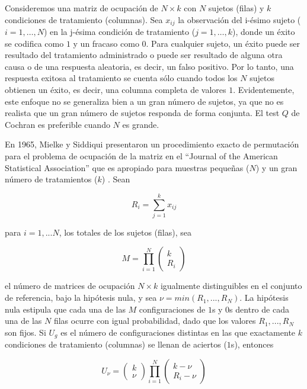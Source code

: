 \documentclass[12pt,a4paper,]{book}
\numberwithin{dummy}{section}
\theoremstyle{ocrenumbox}
\theoremstyle{blacknumex}
\theoremstyle{blacknumbox}
\theoremstyle{ocrenum}
\theoremstyle{ocrenum}
\begin{document}
Consideremos una matriz de ocupación de \(N\times k\) con \(N\) sujetos
(filas) y \(k\) condiciones de tratamiento (columnas). Sea \(x_{ij}\) la
observación del i-ésimo sujeto (\(i = 1, … , N\)) en la j-ésima
condición de tratamiento (\(j = 1, … , k\)), donde un éxito se codifica
como \(1\) y un fracaso como \(0\). Para cualquier sujeto, un éxito
puede ser resultado del tratamiento administrado o puede ser resultado
de alguna otra causa o de una respuesta aleatoria, es decir, un falso
positivo. Por lo tanto, una respuesta exitosa al tratamiento se cuenta
sólo cuando todos los \(N\) sujetos obtienen un éxito, es decir, una
columna completa de valores \(1\). Evidentemente, este enfoque no se
generaliza bien a un gran número de sujetos, ya que no es realista que
un gran número de sujetos responda de forma conjunta. El test \(Q\) de
Cochran es preferible cuando \(N\) es grande.

En 1965, Mielke y Siddiqui presentaron un procedimiento exacto de
permutación para el problema de ocupación de la matriz en el ``Journal
of the American Statistical Association'' que es apropiado para muestras
pequeñas (\(N\)) y un gran número de tratamientos (\(k\))
\citep{Mielke1965}. Sean

\[
R_i=\sum_{j=1}^kx_{ij}
\]

para \(i = 1, . . . N\), los totales de los sujetos (filas), sea

\[
M=\prod_{i=1}^N\left(\begin{array}{c}k\\ R_i\end{array}\right)
\]

el número de matrices de ocupación \(N \times k\) igualmente
distinguibles en el conjunto de referencia, bajo la hipótesis nula, y
sea \(\nu = min(R_1, . . . , R_N)\). La hipótesis nula estipula que cada
una de las \(M\) configuraciones de \(1\)s y \(0\)s dentro de cada una
de las \(N\) filas ocurre con igual probabilidad, dado que los valores
\(R_1, . . . , R_N\) son fijos. Si \(U_g\) es el número de
configuraciones distintas en las que exactamente \(k\) condiciones de
tratamiento (columnas) se llenan de aciertos (\(1\)s), entonces

\[
U_\nu=\left(\begin{array}{c}k\\ \nu\end{array}\right)\prod_{i=1}^N\left(\begin{array}{c}k-\nu\\ R_i-\nu\end{array}\right)
\]
\end{document}
